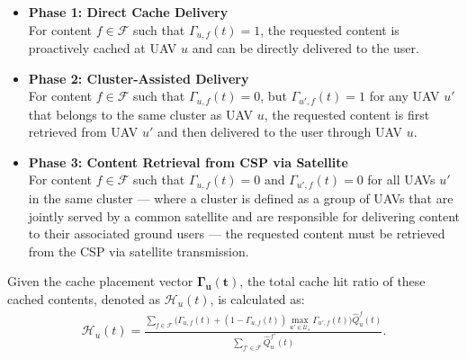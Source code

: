\documentclass[journal]{IEEEtran}
\begin{document}
\begin{itemize} 
    \item \textbf{Phase 1: Direct Cache Delivery} \\
    For content \( f  \in \mathcal {F} \) such that \( \Gamma_{u,f}(t) = 1 \), the requested content is proactively cached at UAV \( u \) and can be directly delivered to the user.

    \item \textbf{Phase 2: Cluster-Assisted Delivery} \\
   For content \( f \in \mathcal{F} \) such that \( \Gamma_{u,f}(t) = 0 \), but \( \Gamma_{u',f}(t) = 1 \) for any UAV \( u' \) that belongs to the same cluster as UAV \( u \), the requested content is first retrieved from UAV \( u' \) and then delivered to the user through UAV \( u \).


    \item \textbf{Phase 3: Content Retrieval from CSP via Satellite} \\
    For content \( f \in \mathcal{F} \) such that \( \Gamma_{u,f}(t) = 0 \) and \( \Gamma_{u',f}(t) = 0 \) for all UAVs \( u' \) in the same cluster — where a cluster is defined as a group of UAVs that are jointly served by a common satellite and are responsible for delivering content to their associated ground users — the requested content must be retrieved from the CSP via satellite transmission.

\end{itemize}
Given the cache placement vector \(\boldsymbol{\Gamma_{u}(t)}\), the total cache hit ratio of these cached contents, denoted as \( \mathcal{H}_u(t)\), is calculated as: 
\begin{align}
    \mathcal{H}_u(t) = \frac{ {\sum\limits_{f \in \mathcal{F}} \Big( \Gamma_{u,f}(t) + (1 - \Gamma_{u,f}(t)) \max\limits_{u' \in \mathcal{U}_{s}} \Gamma_{u',f}(t) \Big) \hat{Q}^f_{u}(t)}}{\sum\limits_{f' \in \mathcal{F}} \hat{Q}^{f'}_{u}(t)}. \label{cachehit}
\end{align}

\end{document}
